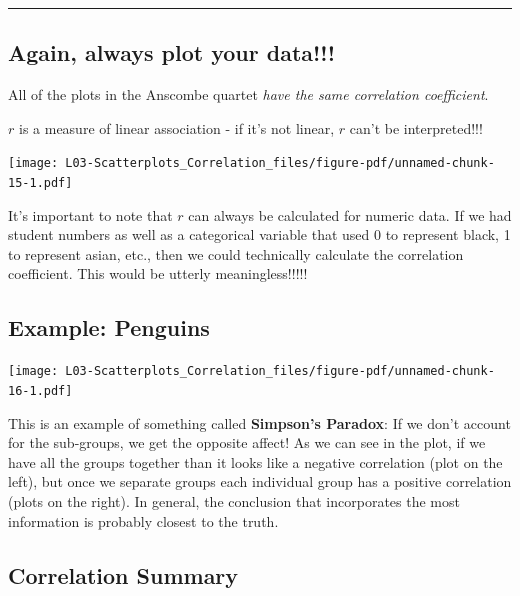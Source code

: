 \documentclass[
  letterpaper,
  DIV=11,
  numbers=noendperiod,
  oneside]{scrreprt}
\begin{document}
\begin{center}\rule{0.5\linewidth}{0.5pt}\end{center}

\hypertarget{again-always-plot-your-data}{%
\subsection{Again, always plot your
data!!!}\label{again-always-plot-your-data}}

\vspace{1cm}

All of the plots in the Anscombe quartet \emph{have the same correlation
coefficient}.

\(r\) is a measure of linear association - if it's not linear, \(r\)
can't be interpreted!!!

\texttt{[image: L03-Scatterplots\_Correlation\_files/figure-pdf/unnamed-chunk-15-1.pdf]}

It's important to note that \(r\) can always be calculated for numeric
data. If we had student numbers as well as a categorical variable that
used 0 to represent black, 1 to represent asian, etc., then we could
technically calculate the correlation coefficient. This would be utterly
meaningless!!!!!

\hypertarget{example-penguins}{%
\subsection{Example: Penguins}\label{example-penguins}}

\texttt{[image: L03-Scatterplots\_Correlation\_files/figure-pdf/unnamed-chunk-16-1.pdf]}

This is an example of something called \textbf{Simpson's Paradox}: If we
don't account for the sub-groups, we get the opposite affect! As we can
see in the plot, if we have all the groups together than it looks like a
negative correlation (plot on the left), but once we separate groups
each individual group has a positive correlation (plots on the right).
In general, the conclusion that incorporates the most information is
probably closest to the truth.

\hypertarget{correlation-summary}{%
\subsection{Correlation Summary}\label{correlation-summary}}
\end{document}
